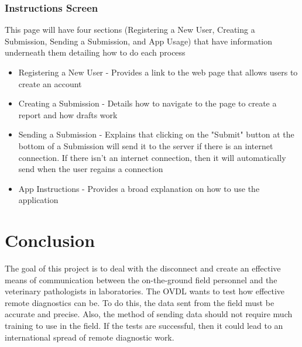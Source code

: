 \documentclass[onecolumn, draftclsnofoot,10pt, compsoc]{IEEEtran}
\begin{document}
\subsubsection{Instructions Screen}
This page will have four sections (Registering a New User, Creating a Submission, Sending a Submission, and App Usage) that have information underneath them detailing how to do each process
\begin{itemize}

\item Registering a New User - Provides a link to the web page that allows users to create an account
\item Creating a Submission - Details how to navigate to the page to create a report and how drafts work
\item Sending a Submission - Explains that clicking on the "Submit" button at the bottom of a Submission will send it to the server if there is an internet connection. If there isn't an internet connection, then it will automatically send when the user regains a connection
\item App Instructions - Provides a broad explanation on how to use the application
\end{itemize}

\section{Conclusion}
The goal of this project is to deal with the disconnect and create an effective means of communication between the on-the-ground field personnel and the veterinary pathologists in laboratories. The OVDL wants to test how effective remote diagnostics can be. To do this, the data sent from the field must be accurate and precise. Also, the method of sending data should not require much training to use in the field. If the tests are successful, then it could lead to an international spread of remote diagnostic work.
\end{document}
